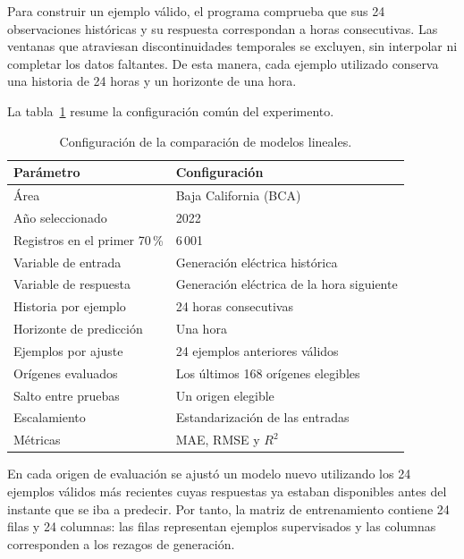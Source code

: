 Para construir un ejemplo válido, el programa comprueba que sus 24 observaciones históricas y su respuesta correspondan a horas consecutivas. Las ventanas que atraviesan discontinuidades temporales se excluyen, sin interpolar ni completar los datos faltantes. De esta manera, cada ejemplo utilizado conserva una historia de 24 horas y un horizonte de una hora.

La tabla~\ref{tab:configuracion-comparacion-lineales} resume la configuración común del experimento.

\begin{table}[htbp]
    \centering
    \caption{Configuración de la comparación de modelos lineales.}
    \label{tab:configuracion-comparacion-lineales}
    \begin{tabular}{p{}p{}}
        \toprule
        Parámetro & Configuración \\
        \midrule
        Área & Baja California (BCA) \\
        Año seleccionado & 2022 \\
        Registros en el primer 70\,\% & 6\,001 \\
        Variable de entrada & Generación eléctrica histórica \\
        Variable de respuesta & Generación eléctrica de la hora siguiente \\
        Historia por ejemplo & 24 horas consecutivas \\
        Horizonte de predicción & Una hora \\
        Ejemplos por ajuste & 24 ejemplos anteriores válidos \\
        Orígenes evaluados & Los últimos 168 orígenes elegibles \\
        Salto entre pruebas & Un origen elegible \\
        Escalamiento & Estandarización de las entradas \\
        Métricas & MAE, RMSE y $R^2$ \\
        \bottomrule
    \end{tabular}
\end{table}

En cada origen de evaluación se ajustó un modelo nuevo utilizando los 24 ejemplos válidos más recientes cuyas respuestas ya estaban disponibles antes del instante que se iba a predecir. Por tanto, la matriz de entrenamiento contiene 24 filas y 24 columnas: las filas representan ejemplos supervisados y las columnas corresponden a los rezagos de generación.

